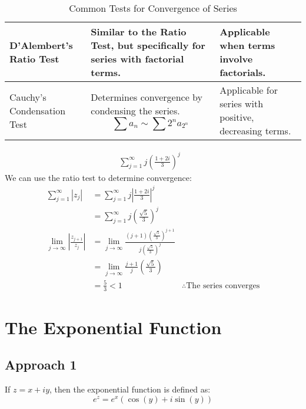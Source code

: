 \begin{table}[htbp]
\begin{tabular}{| m{3cm} | m{7cm} | m{4cm} |}
        \hline
        D'Alembert's Ratio Test    & Similar to the Ratio Test, but specifically for series with factorial terms.                                                           & Applicable when terms involve factorials.                           \\
        \hline
        Cauchy's Condensation Test & Determines convergence by condensing the series. \[ \sum a_n \sim \sum 2^n a_{2^n} \]                                                  & Applicable for series with positive, decreasing terms.              \\
        \hline
    \end{tabular}
    \caption{Common Tests for Convergence of Series}
    \label{table:convergence_tests}
\end{table}


\begin{example}
    \begin{align}
        \sum_{j=1}^{\infty} j \left( \frac{1 + 2i}{3} \right)^j &
    \end{align}
    We can use the ratio test to determine convergence:
    \begin{align}
        \sum_{j=1}^{\infty} \left| z_j \right|                 & = \sum_{j=1}^{\infty} j \left| \frac{1 + 2i}{3} \right|^j                                 \\
                                                               & = \sum_{j=1}^{\infty} j \left( \frac{\sqrt{5}}{3} \right)^j                               \\
        \lim_{j \to \infty} \left| \frac{z_{j+1}}{z_j} \right| & = \lim_{j \to \infty} \frac{(j+1)({\frac{\sqrt{5}}{3}})^{j + 1}}{j(\frac{\sqrt{5}}{3})^j} \\
                                                               & = \lim_{j \to \infty} \frac{j+1}{j} \left( \frac{\sqrt{5}}{3} \right)                     \\
                                                               & = \frac{5}{3} < 1
                                                               & \therefore \text{The series converges}
    \end{align}
\end{example}

\section{The Exponential Function}
\subsection*{Approach 1}
\begin{definition}
    If $z = x + iy$, then the exponential function is defined as:
    \begin{equation}
        e^z = e^x \left( \cos(y) + i \sin(y) \right)
    \end{equation}
\end{definition}

